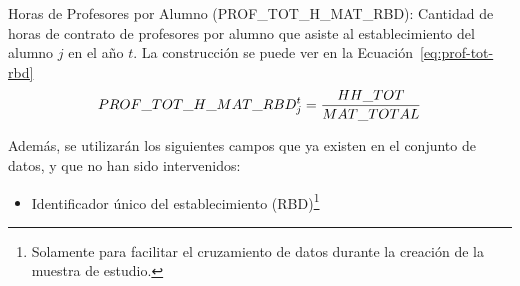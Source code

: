 \begin{longdescription}
\begin{longdescription}
                \item[Horas de Profesores por Alumno](PROF\_TOT\_H\_MAT\_RBD): Cantidad de horas de contrato de profesores por alumno que asiste al establecimiento del alumno $j$ en el año $t$. La construcción se puede ver en la Ecuación~\ref{eq:prof-tot-rbd}
                  \begin{equation}
                  \centering
                    PROF\_TOT\_H\_MAT\_RBD_{j}^{t} = \frac{HH\_TOT}{MAT\_TOTAL}
                    \label{eq:prof-tot-rbd}
                  \end{equation}
            \end{longdescription}
        Además, se utilizarán los siguientes campos que ya existen en el conjunto de datos, y que no han sido intervenidos:
            \begin{itemize}
              \item Identificador único del establecimiento (RBD)\footnote{Solamente para facilitar el cruzamiento de datos durante la creación de la muestra de estudio.}
            \end{itemize}
        \end{longdescription}